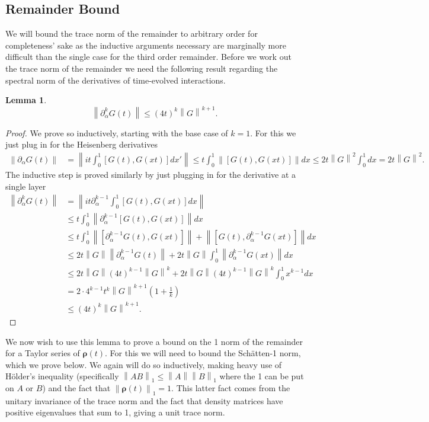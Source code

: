 \documentclass[
 amsmath,amssymb,
 aps,
onecolumn, 
nofootinbib]{revtex4-2}
\newtheorem{lemma}[theorem]{Lemma}
\newcommand{\norm}[1]{\left\| #1 \right\|}
\begin{document}
\subsection{Remainder Bound} \label{sec:weak_coupling_remainder_bound}
We will bound the trace norm of the remainder to arbitrary order for completeness' sake as the inductive arguments necessary are marginally more difficult than the single case for the third order remainder. Before we work out the trace norm of the remainder we need the following result regarding the spectral norm of the derivatives of time-evolved interactions.
\begin{lemma}
    \begin{equation}
         \norm{\partial_\alpha^k G( t)} \le (4 t)^k \norm{G}^{k + 1}.
    \end{equation}
\end{lemma} \label{lem:remainder_bound_interaction_norm}
\begin{proof}
    We prove so inductively, starting with the base case of $k = 1$. For this we just plug in for the Heisenberg derivatives
    \begin{align}
        \norm{\partial_\alpha G( t) } &=  \norm{i  t \int_0^1 [G(t), G(x t)] dx'} \le t \int_0^1  \norm{[G(t), G(x t)]} dx  \le 2 t \norm{G}^2 \int_0^1   dx = 2 t \norm{G}^2.
    \end{align}
    The inductive step is proved similarly by just plugging in for the derivative at a single layer
    \begin{align}
        \norm{\partial_\alpha^k G( t)} &= \norm{i  t \partial_\alpha^{k - 1}\int_0^1[G(t), G( x t)] dx } \\
        &\le t  \int_0^1 \norm{\partial_\alpha^{k - 1} [G(t), G( x t)]} dx  \\
        &\le t  \int_0^1  \norm{[\partial_\alpha^{k-1} G( t), G( x t)]} + \norm{[G(t) , \partial_{\alpha}^{k-1} G(x t)]} dx \\
        &\le 2 t \norm{G} \norm{\partial_{\alpha}^{k -1} G(t)} + 2 t \norm{G} \int_0^1 \norm{\partial_{\alpha}^{k - 1} G(x t)} d x \\
        &\le 2 t \norm{G} (4 t)^{k - 1} \norm{G}^k + 2t \norm{G} (4 t)^{k -1} \norm{G}^{k} \int_0^1 x^{k - 1} d x \\
        &= 2 \cdot 4^{k - 1} t^{k} \norm{G}^{k + 1} \left(1 + \frac{1}{k} \right) \\
        &\le  (4 t)^k \norm{G}^{k + 1}.
    \end{align}
\end{proof}
We now wish to use this lemma to prove a bound on the 1 norm of the remainder for a Taylor series of $\boldsymbol{\rho}(t)$. For this we will need to bound the Schätten-1 norm, which we prove below.  We again will do so inductively, making heavy use of Hölder's inequality (specifically $\norm{A B}_1 \le \norm{A} \norm{B}_1$ where the 1 can be put on $A$ or $B$) and the fact that $\norm{\boldsymbol{\rho}(t)}_1 = 1$. This latter fact comes from the unitary invariance of the trace norm and the fact that density matrices have positive eigenvalues that sum to 1, giving a unit trace norm. 
\end{document}
